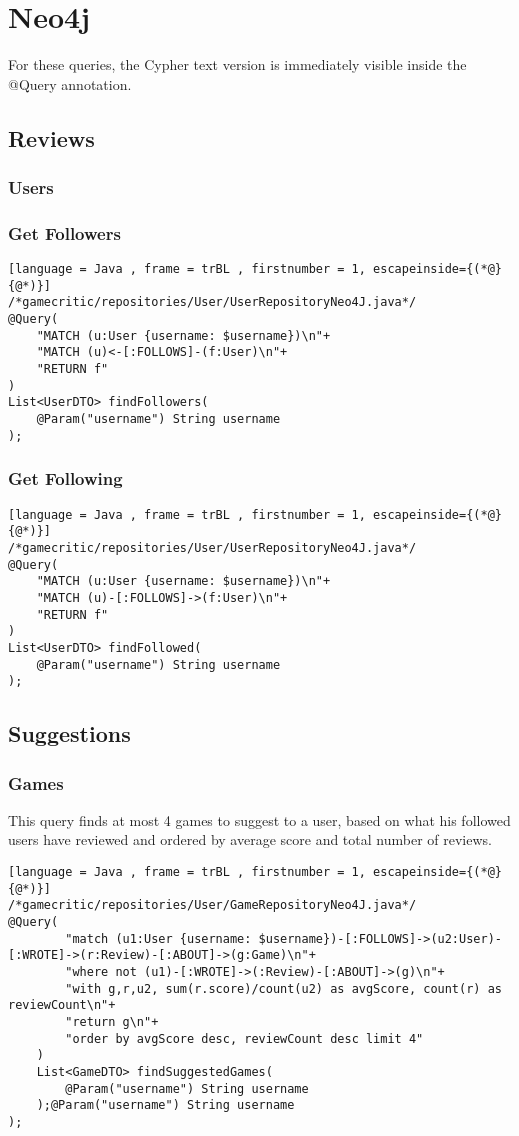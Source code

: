 \section{Neo4j}
For these queries, the Cypher text version is immediately visible inside the @Query annotation.
\subsection{Reviews}
\subsubsection{Users}
\subsubsection{Get Followers}
\begin{lstlisting}[language = Java , frame = trBL , firstnumber = 1, escapeinside={(*@}{@*)}]
/*gamecritic/repositories/User/UserRepositoryNeo4J.java*/
@Query(
	"MATCH (u:User {username: $username})\n"+
	"MATCH (u)<-[:FOLLOWS]-(f:User)\n"+
	"RETURN f"
)
List<UserDTO> findFollowers(
	@Param("username") String username
);
\end{lstlisting}
\subsubsection{Get Following}
\begin{lstlisting}[language = Java , frame = trBL , firstnumber = 1, escapeinside={(*@}{@*)}]
/*gamecritic/repositories/User/UserRepositoryNeo4J.java*/
@Query(
	"MATCH (u:User {username: $username})\n"+
	"MATCH (u)-[:FOLLOWS]->(f:User)\n"+
	"RETURN f"
)
List<UserDTO> findFollowed(
	@Param("username") String username
);
\end{lstlisting}
\subsection{Suggestions}
\subsubsection{Games}
This query finds at most 4 games to suggest to a user, based on what his followed users have reviewed and ordered by average score and total number of reviews.
\begin{lstlisting}[language = Java , frame = trBL , firstnumber = 1, escapeinside={(*@}{@*)}]
/*gamecritic/repositories/User/GameRepositoryNeo4J.java*/
@Query(
        "match (u1:User {username: $username})-[:FOLLOWS]->(u2:User)-[:WROTE]->(r:Review)-[:ABOUT]->(g:Game)\n"+
        "where not (u1)-[:WROTE]->(:Review)-[:ABOUT]->(g)\n"+
        "with g,r,u2, sum(r.score)/count(u2) as avgScore, count(r) as reviewCount\n"+
        "return g\n"+
        "order by avgScore desc, reviewCount desc limit 4"
    )
    List<GameDTO> findSuggestedGames(
        @Param("username") String username
    );@Param("username") String username
);
\end{lstlisting}

